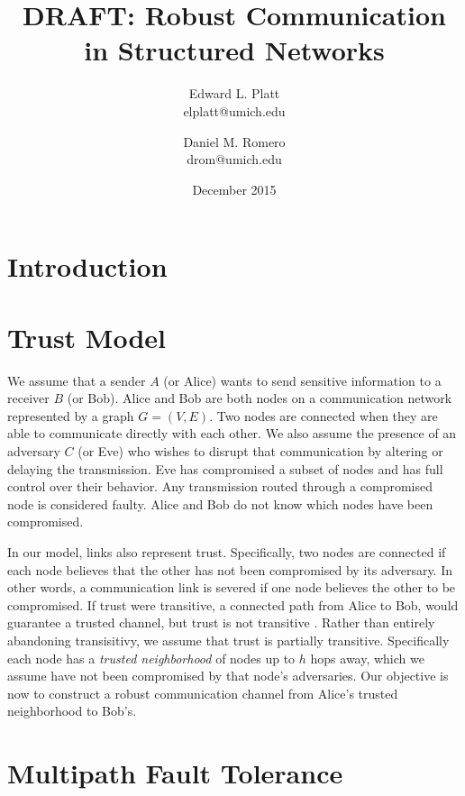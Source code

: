 \documentclass[twocolumn]{article}
\title{DRAFT: Robust Communication in Structured Networks}
\author{
    Edward L. Platt\\
    elplatt@umich.edu
    \and
    Daniel M. Romero\\
    drom@umich.edu
}
\date{December 2015}
\begin{document}
\maketitle

\section{Introduction}

\section{Trust Model}

We assume that a sender $A$ (or Alice) wants to send sensitive information
to a receiver $B$ (or Bob).
Alice and Bob are both nodes on a communication network represented by a graph
$G = (V, E)$.
Two nodes are connected when they are able to communicate directly with each
other.
We also assume the presence of an adversary $C$ (or Eve) who wishes to disrupt
that communication by altering or delaying the transmission.
Eve has compromised a subset of nodes and has full control over their behavior.
Any transmission routed through a compromised node is considered faulty.
Alice and Bob do not know which nodes have been compromised.

In our model, links also represent trust.
Specifically, two nodes are connected if each node believes that the other
has not been compromised by its adversary.
In other words, a communication link is severed if one node believes the other
to be compromised.
If trust were transitive, a connected path from Alice to Bob, would guarantee
a trusted channel, but trust is not transitive \cite{christianson_why_1997}.
Rather than entirely abandoning transisitivy, we assume that trust is
partially transitive.
Specifically each node has a {\em trusted neighborhood} of nodes up to $h$ hops
away, which we assume have not been compromised by that node's adversaries.
Our objective is now to construct a robust communication channel from Alice's
trusted neighborhood to Bob's.

\section{Multipath Fault Tolerance}
\end{document}
